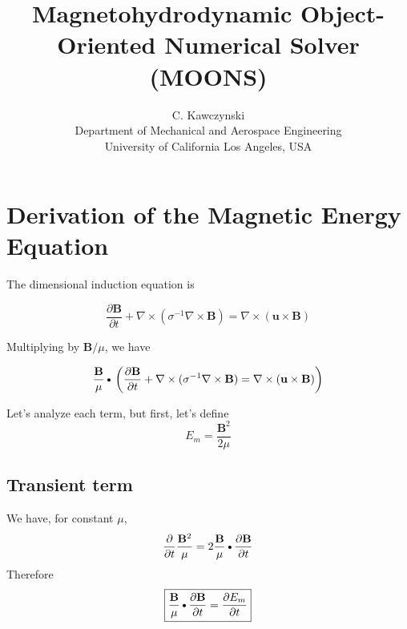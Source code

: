 \documentclass[11pt]{article}
\newcommand{\B}{\mathbf{B}}
\newcommand{\PD}{\partial}
\newcommand{\BM}{\frac{\mathbf{B}}{\mu}}
\renewcommand{\U}{\mathbf{u}}
\newcommand{\SII}{\sigma^{-1}}
\newcommand{\DOT}{\text{\textbullet}}
\begin{document}
\doublespacing
\title{Magnetohydrodynamic Object-Oriented Numerical Solver (MOONS)}
\author{C. Kawczynski \\
Department of Mechanical and Aerospace Engineering \\
University of California Los Angeles, USA\\
}
\maketitle

\section{Derivation of the Magnetic Energy Equation}
The dimensional induction equation is

\begin{equation}
	\frac{\PD \B}{\PD t} +
	\nabla \times (\SII \nabla \times \B) =
	\nabla \times (\U \times \B)
\end{equation}

Multiplying by $\B / \mu$, we have

\begin{equation}
	\BM \DOT
	\left(
	\frac{\PD \B}{\PD t} +
	\nabla \times (\SII \nabla \times \B) =
	\nabla \times (\U \times \B)
	\right)
\end{equation}

Let's analyze each term, but first, let's define
\begin{equation}
	E_m = \frac{\B^2}{2\mu}
\end{equation}

\subsection{Transient term}
We have, for constant $\mu$,
\begin{equation}
	\frac{\PD}{\PD t} \frac{\B^2}{\mu} = 2 \BM \DOT \frac{\PD \B}{\PD t}
\end{equation}
Therefore
\begin{equation}
	\boxed{
	\BM \DOT \frac{\PD \B}{\PD t} =
	\frac{\PD E_m}{\PD t}
	}
\end{equation}
\end{document}
